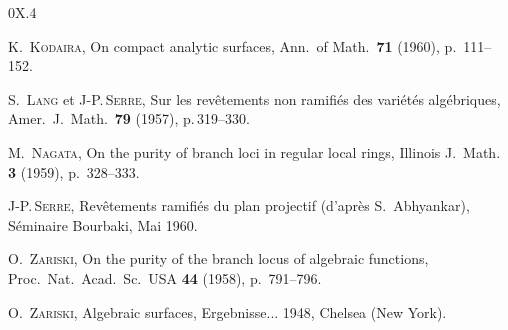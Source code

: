 \begin{thebibliography}{0}{X.4}

 K.\, \textsc{Kodaira}, On compact analytic surfaces,
Ann.\ of Math.\ \textbf{71} (1960), p.\, 111--152.

 S.\, \textsc{Lang} et
J-P.\,\textsc{Serre}, Sur les rev\^etements non
ramifi\'es des vari\'et\'es alg\'ebriques,
Amer.\ J.\ Math.\ \textbf{79} (1957), p.\,319--330.

 M.\, \textsc{Nagata},
On the purity of branch loci in regular local rings,
Illinois J.\ Math. \textbf{3} (1959), p.\, 328--333.

J-P.\,\textsc{Serre}, Rev\^etements ramifi\'es du plan
projectif (d'apr\`es S.\, Abhyankar), S\'eminaire Bourbaki, Mai
1960.

 O.\, \textsc{Zariski},
On the purity of the branch locus of algebraic functions,
Proc.\ Nat.\ Acad.\ Sc.\ USA  \textbf{44} (1958), p.\, 791--796.


 O.\, \textsc{Zariski},
Algebraic surfaces, Ergebnisse... 1948, Chelsea (New York).
\end{thebibliography}

